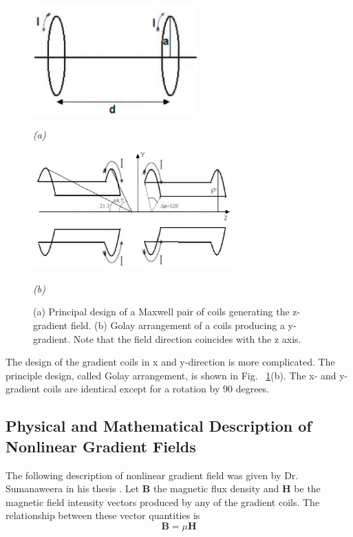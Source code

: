 \begin{figure}[htb]
  \begin{minipage}[b]{2.5in}
    \centering
    \centerline{\mbox{\includegraphics[width=2.5in]{background/images/coil_z.eps}}}
    \centerline{\mbox{\emph{(a)}}}
  \end{minipage}
  \begin{minipage}[b]{3in}
    \centering
    \centerline{\mbox{\includegraphics[width=3in]{background/images/coil_y.eps}}}
    \centerline{\mbox{\emph{(b)}}}
  \end{minipage}
  \caption{(a) Principal design of a Maxwell pair of coils generating the z-gradient field. (b) Golay arrangement of a coils producing a y-gradient. Note that the field direction coincides with the z axis.} 
  \label{fig:coil_axis}
\end{figure}

The design of the gradient coils in x and y-direction is more complicated. The principle design, called Golay arrangement, is shown in Fig. ~\ref{fig:coil_axis}(b). The x- and y-gradient coils are identical except for a rotation by 90 degrees. 

\subsection{Physical and Mathematical Description of Nonlinear Gradient Fields}

The following description of nonlinear gradient field was given by Dr. Sumanaweera in his thesis 
\cite{sumanaweera_thesis}. Let \textbf{B} the magnetic flux density and \textbf{H} be the magnetic field intensity vectors produced by any of the gradient coils. The relationship between these vector quantities is 
\begin{equation}
  \textbf{B} = \mu \textbf{H}
\end{equation}

